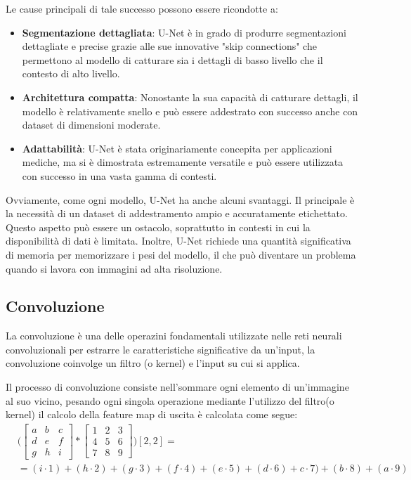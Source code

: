 Le cause principali di tale successo possono essere ricondotte a:
\begin{itemize} \item \textbf{Segmentazione dettagliata}: U-Net è in grado di
produrre segmentazioni dettagliate e precise grazie alle sue innovative "skip
connections" che permettono al modello di catturare sia i dettagli di basso
livello che il contesto di alto livello.  \item \textbf{Architettura compatta}:
Nonostante la sua capacità di catturare dettagli, il modello è relativamente
snello e può essere addestrato con successo anche con dataset di dimensioni
moderate.  \item \textbf{Adattabilità}: U-Net è stata originariamente concepita
per applicazioni mediche, ma si è dimostrata estremamente versatile e può essere
utilizzata con successo in una vasta gamma di contesti.  \end{itemize}

Ovviamente, come ogni modello, U-Net ha anche alcuni svantaggi. Il principale è
la necessità di un dataset di addestramento ampio e accuratamente etichettato.
Questo aspetto può essere un ostacolo, soprattutto in contesti in cui la
disponibilità di dati è limitata. Inoltre, U-Net richiede una quantità
significativa di memoria per memorizzare i pesi del modello, il che può
diventare un problema quando si lavora con immagini ad alta risoluzione.




\subsection{Convoluzione} %
\label{sec:convoluzione}


La convoluzione è una delle operazini fondamentali utilizzate nelle reti neurali convoluzionali per estrarre le caratteristiche significative da un'input, la convoluzione coinvolge un filtro (o kernel) e l'input su cui si applica.

Il processo di convoluzione consiste nell'sommare ogni elemento di un'immagine al suo vicino, pesando ogni singola operazione mediante l'utilizzo del filtro(o kernel) il calcolo della feature map di uscita è calcolata come segue:
\begin{align}
  &\Bigg( \begin{bmatrix}
    a & b & c \\
    d & e & f \\
    g & h & i
  \end{bmatrix}
  *
  \begin{bmatrix}
    1 & 2 & 3 \\
    4 & 5 & 6 \\
    7 & 8 & 9
  \end{bmatrix}
  \Bigg) [2, 2] =\\
  &= (i \cdot 1) + (h \cdot 2) + (g \cdot 3) + (f \cdot 4) + ( e \cdot 5 ) + ( d \cdot 6 ) + c \cdot 7) + (b \cdot 8) + (a \cdot 9)
\end{align}


